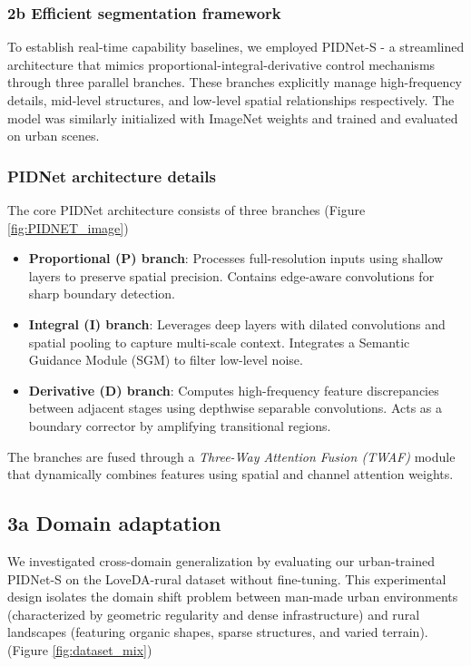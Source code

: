 \documentclass{article}
\begin{document}
\begin{multicols}{2}
\subsubsection{2b Efficient segmentation framework}
To establish real-time capability baselines, we employed PIDNet-S - a streamlined architecture that mimics proportional-integral-derivative control mechanisms through three parallel branches. These branches explicitly manage high-frequency details, mid-level structures, and low-level spatial relationships respectively. The model was similarly initialized with ImageNet weights and trained and evaluated on urban scenes.





\subsubsection{PIDNet architecture details}
The core PIDNet architecture \cite{pidnet2023} consists of three branches (Figure \ref{fig:PIDNET_image})
\begin{itemize}
	\item \textbf{Proportional (P) branch}: Processes full-resolution inputs using shallow layers to preserve spatial precision. Contains edge-aware convolutions for sharp boundary detection.
	\item \textbf{Integral (I) branch}: Leverages deep layers with dilated convolutions and spatial pooling to capture multi-scale context. Integrates a Semantic Guidance Module (SGM) to filter low-level noise.
	\item \textbf{Derivative (D) branch}: Computes high-frequency feature discrepancies between adjacent stages using depthwise separable convolutions. Acts as a boundary corrector by amplifying transitional regions.
\end{itemize}
The branches are fused through a \textit{Three-Way Attention Fusion (TWAF)} module that dynamically combines features using spatial and channel attention weights.
 
\subsection{3a Domain adaptation }
\label{subsec:domain_shift}
We investigated cross-domain generalization by evaluating our urban-trained PIDNet-S on the LoveDA-rural dataset without fine-tuning. This experimental design isolates the domain shift problem between man-made urban environments (characterized by geometric regularity and dense infrastructure) and rural landscapes (featuring organic shapes, sparse structures, and varied terrain).
(Figure \ref{fig:dataset_mix})
\\


\end{multicols}
\end{document}

